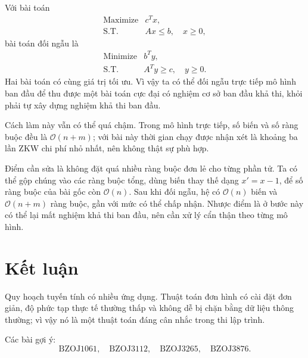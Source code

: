 \documentclass[11pt]{article}
\newcommand{\Oh}{\mathcal{O}}
\newcommand{\ST}{\text{S.T.}}
\begin{document}
Với bài toán
\[
  \begin{array}{ll}
  \text{Maximize} & c^T x,\\
  \ST & Ax\le b,\quad x\ge 0,
  \end{array}
\]
bài toán đối ngẫu là
\[
  \begin{array}{ll}
  \text{Minimize} & b^T y,\\
  \ST & A^T y\ge c,\quad y\ge 0.
  \end{array}
\]
Hai bài toán có cùng giá trị tối ưu. Vì vậy ta có thể đối ngẫu trực tiếp
mô hình ban đầu để thu được một bài toán cực đại có nghiệm cơ sở ban đầu khả
thi, khỏi phải tự xây dựng nghiệm khả thi ban đầu.

Cách làm này vẫn có thể quá chậm. Trong mô hình trực tiếp, số biến và số
ràng buộc đều là \(\Oh(n+m)\); với bài này thời gian chạy được nhận xét là
khoảng ba lần ZKW chi phí nhỏ nhất, nên không thật sự phù hợp.

Điểm cần sửa là không đặt quá nhiều ràng buộc đơn lẻ cho từng phần tử. Ta có
thể gộp chúng vào các ràng buộc tổng, dùng biến thay thế dạng \(x'=x-1\),
để số ràng buộc của bài gốc còn \(\Oh(n)\). Sau khi đối ngẫu, hệ có
\(\Oh(n)\) biến và \(\Oh(n+m)\) ràng buộc, gần với mức có thể chấp nhận.
Nhược điểm là ở bước này có thể lại mất nghiệm khả thi ban đầu, nên cần xử
lý cẩn thận theo từng mô hình.

\section{Kết luận}

Quy hoạch tuyến tính có nhiều ứng dụng. Thuật toán đơn hình có cài đặt đơn
giản, độ phức tạp thực tế thường thấp và không dễ bị chặn bằng dữ liệu thông
thường; vì vậy nó là một thuật toán đáng cân nhắc trong thi lập trình.

Các bài gợi ý:
\[
  \text{BZOJ1061},\quad
  \text{BZOJ3112},\quad
  \text{BZOJ3265},\quad
  \text{BZOJ3876}.
\]
\end{document}
